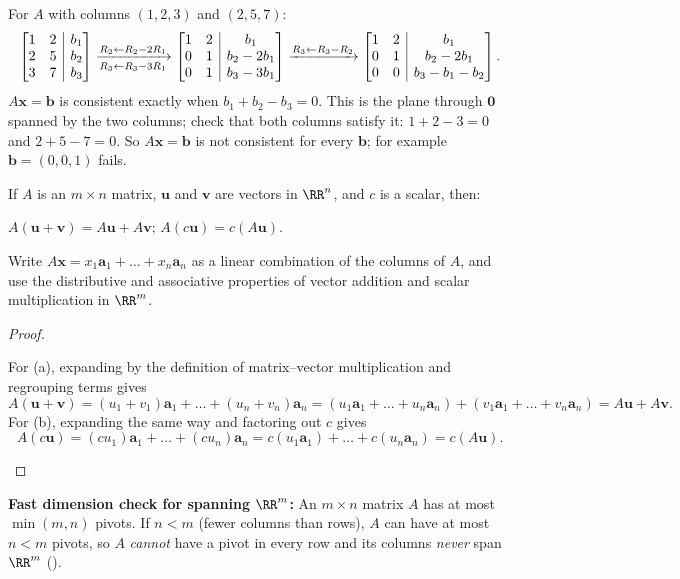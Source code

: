 \documentclass[10pt]{scrartcl}
\makeatletter
\newcommand{\aug}[2]{\left[\begin{array}{@{}#1@{}}#2\end{array}\right]}
\newcommand{\vv}[1]{\mathbf{#1}}
\makeatother
\begin{document}
\begin{example*}
For $A$ with columns $(1,2,3)$ and $(2,5,7)$:
\[
  \aug{rr|c}{1&2&b_1\\2&5&b_2\\3&7&b_3}
  \xrightarrow[R_3\leftarrow R_3-3R_1]{R_2\leftarrow R_2-2R_1}
  \aug{rr|c}{1&2&b_1\\0&1&b_2-2b_1\\0&1&b_3-3b_1}
  \xrightarrow{R_3\leftarrow R_3-R_2}
  \aug{rr|c}{1&2&b_1\\0&1&b_2-2b_1\\0&0&b_3-b_1-b_2}.
\]
$A\vv x=\vv b$ is consistent exactly when $b_1+b_2-b_3=0$. This is the plane through $\vv 0$ spanned by the two columns; check that both columns satisfy it: $1+2-3=0$ and $2+5-7=0$. So $A\vv x=\vv b$ is not consistent for every $\vv b$; for example $\vv b=(0,0,1)$ fails.
\end{example*}

\begin{theorem*}
  If $A$ is an $m\times n$ matrix, $\vv u$ and $\vv v$ are vectors in $\RR^n$, and $c$ is a scalar, then:
  \begin{enumerate}[(a)]
    \ii $A(\vv u + \vv v) = A\vv u + A\vv v$;
    \ii $A(c\vv u) = c(A\vv u)$.
  \end{enumerate}
\end{theorem*}
\begin{ideabox}
  Write $A\vv x=x_1\vv a_1+\dots+x_n\vv a_n$ as a linear combination of the columns of $A$, and use the distributive and associative properties of vector addition and scalar multiplication in $\RR^m$.
\end{ideabox}
\begin{proof}
  \begin{steps}
    \ii For (a), expanding by the definition of matrix--vector multiplication and regrouping terms gives
    \[
      A(\vv u+\vv v) = (u_1+v_1)\vv a_1 + \dots + (u_n+v_n)\vv a_n = (u_1\vv a_1+\dots+u_n\vv a_n) + (v_1\vv a_1+\dots+v_n\vv a_n) = A\vv u + A\vv v.
    \]
    \ii For (b), expanding the same way and factoring out $c$ gives
    \[
      A(c\vv u) = (cu_1)\vv a_1+\dots+(cu_n)\vv a_n = c(u_1\vv a_1)+\dots+c(u_n\vv a_n) = c(A\vv u).
    \]
  \end{steps}
\end{proof}

\begin{shortcuts}
  \ii \textbf{Fast dimension check for spanning $\RR^m$:} An $m\times n$ matrix $A$ has at most $\min(m,n)$ pivots. If $n<m$ (fewer columns than rows), $A$ can have at most $n<m$ pivots, so $A$ \emph{cannot} have a pivot in every row and its columns \emph{never} span $\RR^m$ ().
\end{shortcuts}
\end{document}

